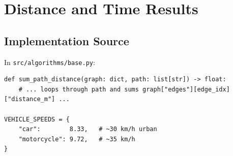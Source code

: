 \documentclass[11pt,a4paper]{article}
\begin{document}
\section{Distance and Time Results}

\subsection{Implementation Source}
In \texttt{src/algorithms/base.py}:
\begin{lstlisting}
def sum_path_distance(graph: dict, path: list[str]) -> float:
    # ... loops through path and sums graph["edges"][edge_idx]["distance_m"] ...

VEHICLE_SPEEDS = {
    "car":        8.33,   # ~30 km/h urban
    "motorcycle": 9.72,   # ~35 km/h
}
\end{lstlisting}
\end{document}
